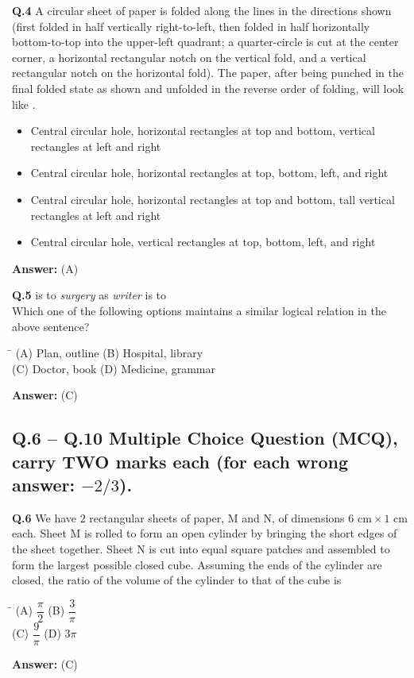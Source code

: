 \documentclass[11pt,a4paper]{article}
\newcommand{\optsfourA}[4]{%
  \begin{tabbing}
    \hspace{0.48\linewidth}\=\kill
    (A) #1 \> (B) #2 \\[2pt]
    (C) #3 \> (D) #4
  \end{tabbing}%
}
\newcommand{\optslistA}[4]{%
  \begin{itemize}
    \setlength{\itemsep}{2pt}\setlength{\parskip}{0pt}
    \item[(A)] #1
    \item[(B)] #2
    \item[(C)] #3
    \item[(D)] #4
  \end{itemize}%
}
\newcommand{\ans}[1]{\textbf{Answer:} #1\par\medskip}
\begin{document}
\textbf{Q.4} A circular sheet of paper is folded along the lines in the directions shown (first folded in half vertically right-to-left, then folded in half horizontally bottom-to-top into the upper-left quadrant; a quarter-circle is cut at the center corner, a horizontal rectangular notch on the vertical fold, and a vertical rectangular notch on the horizontal fold). The paper, after being punched in the final folded state as shown and unfolded in the reverse order of folding, will look like \underline{\hspace{2cm}}.
\optslistA{Central circular hole, horizontal rectangles at top and bottom, vertical rectangles at left and right}{Central circular hole, horizontal rectangles at top, bottom, left, and right}{Central circular hole, horizontal rectangles at top and bottom, tall vertical rectangles at left and right}{Central circular hole, vertical rectangles at top, bottom, left, and right}
\ans{(A)}

\textbf{Q.5} \underline{\hspace{2cm}} is to \textit{surgery} as \textit{writer} is to \underline{\hspace{2cm}}\\
Which one of the following options maintains a similar logical relation in the above sentence?
\optsfourA{Plan, outline}{Hospital, library}{Doctor, book}{Medicine, grammar}
\ans{(C)}

\subsection*{Q.6 -- Q.10 Multiple Choice Question (MCQ), carry TWO marks each (for each wrong answer: $-2/3$).}

\textbf{Q.6} We have $2$ rectangular sheets of paper, M and N, of dimensions $6\text{ cm} \times 1\text{ cm}$ each. Sheet M is rolled to form an open cylinder by bringing the short edges of the sheet together. Sheet N is cut into equal square patches and assembled to form the largest possible closed cube. Assuming the ends of the cylinder are closed, the ratio of the volume of the cylinder to that of the cube is \underline{\hspace{2cm}}
\optsfourA{$\dfrac{\pi}{2}$}{$\dfrac{3}{\pi}$}{$\dfrac{9}{\pi}$}{$3\pi$}
\ans{(C)}
\end{document}
